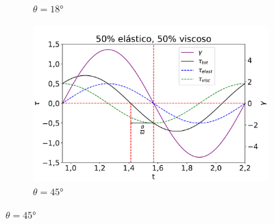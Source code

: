 \begin{figure}[H]
\begin{subfigure}[t]{0.3\textwidth}
					\caption{\(\theta=18°\)}
					\label{fig:osc_sim25}
				\end{subfigure}%
				\begin{subfigure}[t]{0.3\textwidth}
					\centering
					\includegraphics[width=\textwidth]{./imagens/reologia/Simulacao_visc_50}
					\caption{\(\theta=45°\)}
					\label{fig:osc_sim50}
				\end{subfigure}
			

\end{figure}
